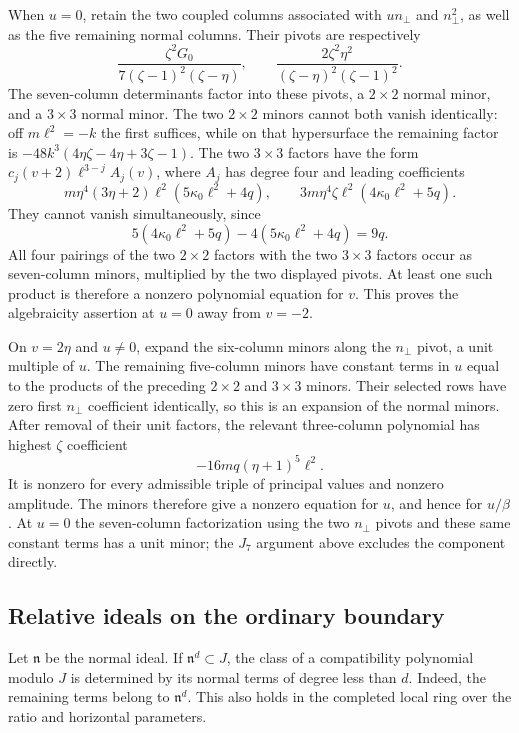 \documentclass[11pt,a4paper]{article}
\numberwithin{equation}{section}
\theoremstyle{plain}
\theoremstyle{definition}
\theoremstyle{remark}
\begin{document}
When $u=0$, retain the two coupled columns associated with $un_\perp$
and $n_\perp^2$, as well as the five remaining normal columns. Their
pivots are respectively
\[
 \frac{\zeta ^2G_0}{7(\zeta -1)^2(\zeta -\eta )},\qquad
 \frac{2\zeta ^2\eta ^2}{(\zeta -\eta )^2(\zeta -1)^2}.
\]
The seven-column determinants factor into these pivots, a
$2\times2$ normal minor, and a $3\times3$ normal minor. The two
$2\times2$ minors cannot both vanish identically: off
$m\ell^2=-k$ the first suffices, while on that hypersurface the
remaining factor is
$-48k^3(4\eta \zeta -4\eta +3\zeta -1)$. The two $3\times3$ factors have the form
$c_j(v+2)\ell^{3-j}A_j(v)$, where $A_j$ has degree four and leading
coefficients
\[
 m\eta ^4(3\eta +2)\ell^2(5\kappa_0 \ell^2+4q),\qquad
 3m\eta ^4\zeta \ell^2(4\kappa_0 \ell^2+5q).
\]
They cannot vanish simultaneously, since
\[
 5(4\kappa_0 \ell^2+5q)-4(5\kappa_0 \ell^2+4q)=9q.
\]
All four pairings of the two $2\times2$ factors with the two
$3\times3$ factors occur as seven-column minors, multiplied
by the two displayed pivots. At least one such product is therefore
a nonzero polynomial equation for $v$. This proves the algebraicity
assertion at $u=0$ away from $v=-2$.

On $v=2\eta $ and $u\ne0$, expand the six-column minors along the
$n_\perp$ pivot, a unit multiple of $u$. The remaining five-column
minors have constant terms in $u$ equal to the products of the
preceding $2\times2$ and $3\times3$ minors. Their selected rows have
zero first $n_\perp$ coefficient identically, so this is an expansion
of the normal minors.
After removal of their unit factors, the relevant three-column
polynomial has highest $\zeta $ coefficient
\[
             -16mq(\eta +1)^5\ell^2.
\]
It is nonzero for every admissible triple of principal values and nonzero amplitude.
The minors therefore give a nonzero equation for $u$, and hence
for $u/\beta$. At $u=0$ the seven-column factorization using the two
$n_\perp$ pivots and these same constant terms has a unit minor; the
$J_7$ argument above excludes the component directly.

\subsection{Relative ideals on the ordinary boundary}
\label{appr3ord:complete}

Let $\mathfrak n$ be the normal ideal. If
$\mathfrak n^d\subset J$, the class of a compatibility polynomial modulo
$J$ is determined by its normal terms of degree less than $d$.
Indeed, the remaining terms belong to $\mathfrak n^d$. This also holds
in the completed local ring over the ratio and horizontal parameters.
\end{document}
